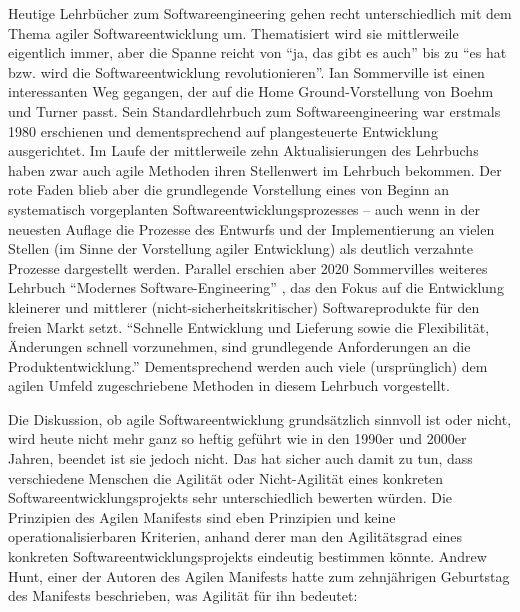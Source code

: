 Heutige Lehrbücher zum Softwareengineering gehen recht unterschiedlich mit dem Thema agiler Softwareentwicklung um. Thematisiert wird sie mittlerweile eigentlich immer, aber die Spanne reicht von "`ja, das gibt es auch"' bis zu "`es hat bzw. wird die Softwareentwicklung revolutionieren"'. Ian Sommerville ist einen interessanten Weg gegangen, der auf die Home Ground-Vorstellung von Boehm und Turner passt. Sein Standardlehrbuch \cite{som18} zum Softwareengineering war erstmals 1980 erschienen und dementsprechend auf plangesteuerte Entwicklung ausgerichtet. Im Laufe der mittlerweile zehn Aktualisierungen des Lehrbuchs haben zwar auch agile Methoden ihren Stellenwert im Lehrbuch bekommen. Der rote Faden blieb aber die grundlegende Vorstellung eines von Beginn an systematisch vorgeplanten Softwareentwicklungsprozesses -- auch wenn in der neuesten Auflage die Prozesse des Entwurfs und der Implementierung an vielen Stellen (im Sinne der Vorstellung agiler Entwicklung) als deutlich verzahnte Prozesse dargestellt werden. Parallel erschien aber 2020 Sommervilles weiteres Lehrbuch "`Modernes Software-Engineering"' \cite{som20}, das den Fokus auf die Entwicklung kleinerer und mittlerer (nicht-sicherheitskritischer) Softwareprodukte für den freien Markt setzt. "`Schnelle Entwicklung und Lieferung sowie die Flexibilität, Änderungen schnell vorzunehmen, sind grundlegende Anforderungen an die Produktentwicklung."' \cite[34]{som20} Dementsprechend werden auch viele (ursprünglich) dem agilen Umfeld zugeschriebene Methoden in diesem Lehrbuch vorgestellt. 

\vspace{1mm} %

Die Diskussion, ob agile Softwareentwicklung grundsätzlich sinnvoll ist oder nicht, wird heute nicht mehr ganz so heftig geführt wie in den 1990er und 2000er Jahren, beendet ist sie jedoch nicht. Das hat sicher auch damit zu tun, dass verschiedene Menschen die Agilität oder Nicht-Agilität eines konkreten Software\-entwicklungs\-projekts sehr unterschiedlich bewerten würden. Die Prinzipien des Agilen Manifests sind eben Prinzipien und keine operationalisierbaren Kriterien, anhand derer man den Agilitätsgrad eines konkreten Softwareentwicklungsprojekts eindeutig bestimmen könnte. Andrew Hunt, einer der Autoren des Agilen Manifests hatte zum zehnjährigen Geburtstag des Manifests beschrieben, was Agilität für ihn bedeutet:

\vspace{3mm} %


